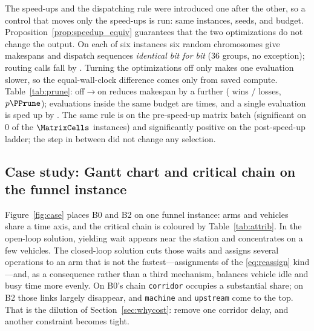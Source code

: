 The speed-ups and the dispatching rule were introduced one after the other, so a control that moves only the speed-ups is run: same instances, seeds, and budget.
Proposition~\ref{prop:speedup_equiv} guarantees that the two optimizations do not change the output.
On each of six instances six random chromosomes give makespans and dispatch sequences \emph{identical bit for bit} ($36$ groups, no exception); routing calls fall by \RouteCallCut{}.
Turning the optimizations off only makes one evaluation slower, so the equal-wall-clock difference comes only from saved compute.
Table~\ref{tab:prune}: off$\to$on reduces makespan by a further \GainPrune{} (\WinPrune{} wins / \LosePrune{} losses, $p\PPrune$); evaluations inside the same budget are \EvalRatioPrune{} times, and a single evaluation is sped up by \SpeedupProbe{}.
The same rule is \GainProbePre{} on the pre-speed-up matrix batch (significant on $0$ of the $\MatrixCells$ instances) and significantly positive on the post-speed-up ladder; the step in between did not change any selection.

\begin{table}[t]
\caption{Pruning and winner-path reuse off versus on (bold header: the setting used here).
Output is bit-identical, so the difference is saved compute.
Same instances, seeds, and wall-clock; $n=60$ pairs, two-sided Wilcoxon ($^{***}p<0.001$).
Ratio columns take the off setting as denominator, in opposite directions.}
\label{tab:prune}
\small

\end{table}

\subsection{Case study: Gantt chart and critical chain on the funnel instance}
\label{sec:casestudy}

Figure~\ref{fig:case} places B0 and B2 on one funnel instance: arms and vehicles share a time axis, and the critical chain is coloured by Table~\ref{tab:attrib}.
In the open-loop solution, yielding wait appears near the station and concentrates on a few vehicles.
The closed-loop solution cuts those waits and assigns several operations to an arm that is not the fastest---assignments of the \eqref{eq:reassign} kind---and, as a consequence rather than a third mechanism, balances vehicle idle and busy time more evenly.
On B0's chain \texttt{corridor} occupies a substantial share; on B2 those links largely disappear, and \texttt{machine} and \texttt{upstream} come to the top.
That is the dilution of Section~\ref{sec:whycost}: remove one corridor delay, and another constraint becomes tight.

